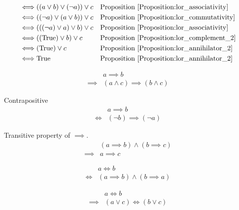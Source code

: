 \begin{prop}
\begin{align*}
\iff & ((a \lor b) \lor (\lnot a)) \lor c
&& \text{Proposition \ref{Proposition:lor_associativity}} \\
\iff & ((\lnot a) \lor (a \lor b)) \lor c
&& \text{Proposition \ref{Proposition:lor_commutativity}} \\
\iff & (((\lnot a) \lor a) \lor b) \lor c
&& \text{Proposition \ref{Proposition:lor_associativity}} \\
\iff & ((\text{True}) \lor b) \lor c
&& \text{Proposition \ref{Proposition:lor_complement_2}} \\
\iff & (\text{True}) \lor c
&& \text{Proposition \ref{Proposition:lor_annihilator_2}} \\
\iff & \text{True}
&& \text{Proposition \ref{Proposition:lor_annihilator_2}} \\
\end{align*}
\end{prop}

\begin{prop}
\label{Proposition:implies_land}
\begin{align*}
& a \implies b \\
\implies & (a \land c) \implies (b \land c)
\end{align*}
\end{prop}

\begin{prop}
\label{Proposition:contrapositive}
Contrapositive
\begin{align*}
& a \implies b \\
\iff & (\lnot b) \implies (\lnot a)
\end{align*}
\end{prop}

\begin{prop}
\label{Proposition:implies_transitive}
Transitive property of $\implies$.
\begin{align*}
& (a \implies b) \land (b \implies c) \\
\implies & a \implies c
\end{align*}
\end{prop}

\begin{prop}
\label{Proposition:iff_implies}
\begin{align*}
& a \iff b \\
\iff & (a \implies b) \land (b \implies a)
\end{align*}
\end{prop}

\begin{prop}
\label{Proposition:iff_lor}
\begin{align*}
& a \iff b \\
\implies & (a \lor c) \iff (b \lor c)
\end{align*}
\end{prop}

